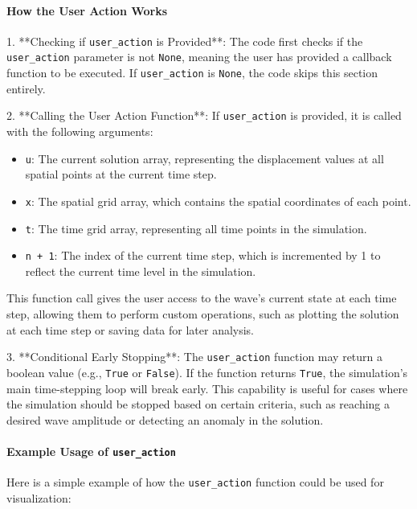 \documentclass{article}
\begin{document}
		\paragraph{ How the User Action Works}
		
		1. **Checking if \texttt{user\_action} is Provided**: 
		The code first checks if the \texttt{user\_action} parameter is not \texttt{None}, meaning the user has provided a callback function to be executed. If \texttt{user\_action} is \texttt{None}, the code skips this section entirely.
		
		2. **Calling the User Action Function**:
		If \texttt{user\_action} is provided, it is called with the following arguments:
		\begin{itemize}
			\item \texttt{u}: The current solution array, representing the displacement values at all spatial points at the current time step.
			\item \texttt{x}: The spatial grid array, which contains the spatial coordinates of each point.
			\item \texttt{t}: The time grid array, representing all time points in the simulation.
			\item \texttt{n + 1}: The index of the current time step, which is incremented by 1 to reflect the current time level in the simulation.
		\end{itemize}
		
		This function call gives the user access to the wave’s current state at each time step, allowing them to perform custom operations, such as plotting the solution at each time step or saving data for later analysis.
		
		3. **Conditional Early Stopping**:
		The \texttt{user\_action} function may return a boolean value (e.g., \texttt{True} or \texttt{False}). If the function returns \texttt{True}, the simulation's main time-stepping loop will break early. This capability is useful for cases where the simulation should be stopped based on certain criteria, such as reaching a desired wave amplitude or detecting an anomaly in the solution.
		
		\paragraph{Example Usage of \texttt{user\_action}}
		
		Here is a simple example of how the \texttt{user\_action} function could be used for visualization:
		
\end{document}
